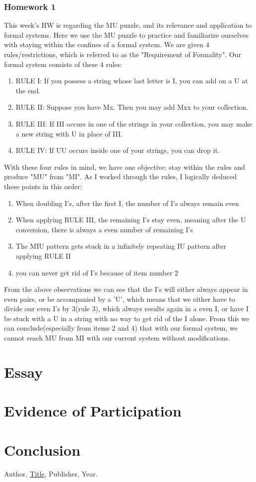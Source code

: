 \documentclass{article}
\theoremstyle{theorem}
\theoremstyle{definition}
\theoremstyle{remark}
\begin{document}
\subsubsection{Homework 1}
This week's HW is regarding the MU puzzle, and its relevance and application to formal systems. Here we use the MU puzzle to practice and familiarize ourselves with staying within the confines of a formal system. We are given 4 rules/restrictions, which is referred to as the "Requirement of Formality". 
Our formal system consists of these 4 rules:
\begin{enumerate}
    \item RULE I: If you possess a string whose last letter is I, you can add on a U at the end. 
    \item RULE II: Suppose you have Mx. Then you may add Mxx to your collection. 
    \item RULE III: If III occurs in one of the strings in your collection, you may make a new
string with U in place of III.
    \item RULE IV: If UU occurs inside one of your strings, you can drop it. 
\end{enumerate}
With these four rules in mind, we have one objective: stay within the rules and produce "MU" from "MI".
As I worked through the rules, I logically deduced these points in this order:
\begin{enumerate}
    \item When doubling I's, after the first I, the number of I's always remain even
    \item When applying RULE III, the remaining I's stay even, meaning after the U conversion, there is always a even number of remaining I's
    \item The MIU pattern gets stuck in a infinitely repeating IU pattern after applying RULE II
    \item you can never get rid of I's because of item number 2
\end{enumerate}

From the above observations we can see that the I's will either always appear in even pairs, or be accompanied by a 'U', which means that we either have to divide our even I's by 3(rule 3), which always results again in a even I, or have I be stuck with a U in a string with no way to get rid of the I alone. 
From this we can conclude(especially from items 2 and 4) that with our formal system, we cannot reach MU from MI with our current system without modifications. 



\section{Essay}

\section{Evidence of Participation}

\section{Conclusion}\label{conclusion}

\begin{thebibliography}{99}
 Author, \href{https://en.wikipedia.org/wiki/LaTeX}{Title}, Publisher, Year.
\end{thebibliography}
\end{document}
